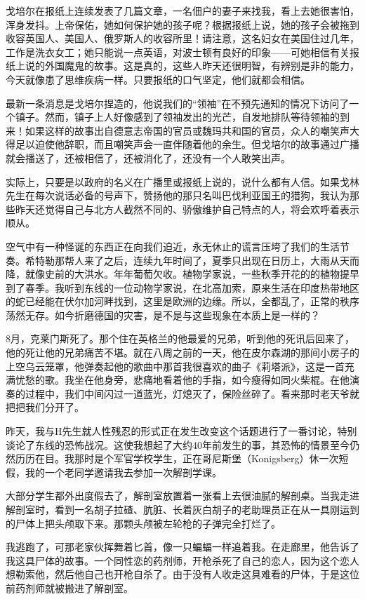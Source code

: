 \documentclass[UTF8]{ctexart}
\begin{document}
戈培尔在报纸上连续发表了几篇文章，一名佃户的妻子来找我，看上去她很害怕，浑身发抖。上帝保佑，她如何保护她的孩子呢？根据报纸上说，她的孩子会被拖到收容英国人、美国人、俄罗斯人的收容所里！请注意，这名妇女在美国住过几年，工作是洗衣女工；她只能说一点英语，对波士顿有良好的印象——可她相信有关报纸上说的外国魔鬼的故事。这是真的，这些人昨天还很明智，有辨别是非的能力，今天就像患了思维疾病一样。只要报纸的口气坚定，他们就都会相信。

最新一条消息是戈培尔捏造的，他说我们的“领袖”在不预先通知的情况下访问了一个镇子。然而，镇子上人好像感到了领袖发出的光芒，自发地排队等待领袖的到来！如果这样的故事出自德意志帝国的官员或魏玛共和国的官员，众人的嘲笑声大得足以迫使他辞职，而且嘲笑声会一直伴随着他的余生。但戈培尔的故事通过广播就会播送了，还被相信了，还被消化了，还没有一个人敢笑出声。

实际上，只要是以政府的名义在广播里或报纸上说的，说什么都有人信。如果戈林先生在每次说话必备的号声下，赞扬他的那只名叫巴伐利亚国王的猎狗，我认为那些昨天还觉得自己与北方人截然不同的、骄傲维护自己特点的人，将会欢呼着表示顺从。

空气中有一种怪诞的东西正在向我们迫近，永无休止的谎言压垮了我们的生活节奏。希特勒那帮人来了之后，连续九年时间了，夏季只出现在日历上，大雨从天而降，就像史前的大洪水。年年葡萄欠收。植物学家说，一些秋季开花的的植物提早到了春季。我听到东线的一位动物学家说，在北高加索，原来生活在印度热带地区的蛇已经能在伏尔加河畔找到，这里是欧洲的边缘。所以，全都乱了，正常的秩序荡然无存。如今折磨德国的灾害，是不是与这些现象在本质上是一样的？

8月，克莱门斯死了。那个住在英格兰的他最爱的兄弟，听到他的死讯后回来了，他的死让他的兄弟痛苦不堪。就在八周之前的一天，他在皮尔森湖的那间小房子的上空乌云笼罩，他弹奏起他的歌曲中那首我很喜欢的曲子《莉塔派》，这是一首充满忧愁的歌。我坐在他身旁，悲痛地看着他的手指，如今瘦得如同火柴棍。在他演奏的过程中，我们中间闪过一道蓝光，灯熄灭了，保险丝碎了。看来那时老天爷就把把我们分开了。

昨天，我与H先生就人性残忍的形式正在发生改变这个话题进行了一番讨论，特别谈论了东线的恐怖战况。这使我想起了大约40年前发生的事，其恐怖的情景至今仍然历历在目。我那时是个军官学校学生，正在哥尼斯堡（Konigsberg）休一次短假，我的一个老同学邀请我去参加一次解剖学课。

大部分学生都外出度假去了，解剖室放置着一张看上去很油腻的解剖桌。当我走进解剖室时，看到一名胡子拉碴、肮脏、长着灰白胡子的老助理员正在从一具刚运到的尸体上把头颅取下来。那颗头颅被左轮枪的子弹完全打烂了。

我逃跑了，可那老家伙挥舞着匕首，像一只蝙蝠一样追着我。在走廊里，他告诉了我这具尸体的故事。一个同性恋的药剂师，开枪杀死了自己的恋人，因为这个恋人想勒索他，然后他自己也开枪自杀了。由于没有人收走这具难看的尸体，于是这位前药剂师就被搬进了解剖室。
\end{document}
